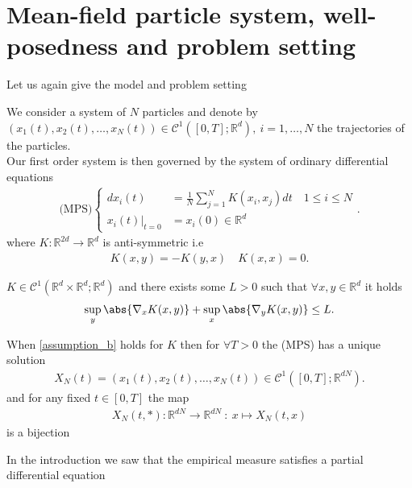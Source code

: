 \section{Mean-field particle system, well-posedness and problem setting}
Let us again give the model and problem setting
\begin{definition}\label{first_order_system}
  We consider a system of $N$ particles and denote by $(x_{1}(t),x_{2}(t),\ldots,x_N(t)) \in  \mathcal{C}^{1}([0,T];\mathbb{R}^{d} ),\ i=1,\ldots ,N $ 
  the trajectories of the particles.\\[1ex]
  Our first order system is then governed by the system of ordinary differential equations 
  \begin{align*}
    \text{(MPS)}\begin{cases}
      d x_i(t) &= \frac{1}{N}\sum_{j=1}^{N} K(x_{i},x_{j}) dt  \quad 1\le i \le N \\
        x_i(t)\rvert_{t=0} &= x_i(0) \in \mathbb{R}^{d} 
    \end{cases}
  .\end{align*}
  where $K : \mathbb{R}^{2d} \to \mathbb{R}^{d}  $ is anti-symmetric i.e
  \begin{align*}
    K(x,y) = -K(y,x) \quad K(x,x) = 0
  .\end{align*}
\end{definition}
\begin{assumption}\label{assumption_b}
  $K \in  \mathcal{C}^{1}(\mathbb{R}^{d} \times \mathbb{R}^{d} ; \mathbb{R}^{d}   ) $ and there exists some $L>0$ such that
  $\forall x,y \in \mathbb{R}^{d} $ it holds 
  \begin{align*}
    \sup_y \abs{\nabla_x K(x,y)} + \sup_x \abs{\nabla_yK(x,y)} \le L
  .\end{align*}
\end{assumption}
\begin{lemma}
  When \autoref{assumption_b} holds for $K$ then for $\forall T>0$ the (MPS) has a unique solution 
  \begin{align*}
    X_N(t) = (x_{1}(t),x_{2}(t),\ldots ,x_{N}(t)) \in  \mathcal{C}^{1} ([0,T];\mathbb{R}^{dN} )
  .\end{align*}
  and for any fixed $t \in  [0,T]$ the map
  \begin{align*}
    X_N(t,*): \mathbb{R}^{dN} \to \mathbb{R}^{dN}  \ :\ x \mapsto X_N(t,x)
  \end{align*}
  is a bijection 
\end{lemma}
In the introduction we saw that the empirical measure satisfies a partial differential equation
